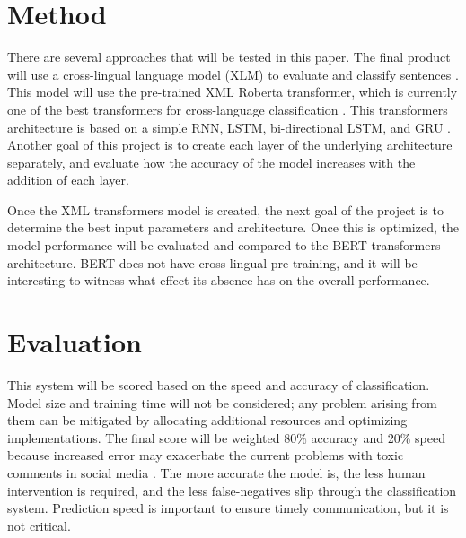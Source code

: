 \documentclass{article}
\begin{document}
\section{Method}

There are several approaches that will be tested in this paper. The final product will use a cross-lingual language model (XLM) to evaluate and classify sentences \cite{lample2019crosslingual}. This model will use the pre-trained XML Roberta transformer, which is currently one of the best transformers for cross-language classification \cite{deep_learning_approaches}. This transformers architecture is based on a simple RNN, LSTM, bi-directional LSTM, and GRU \cite{lample2019crosslingual}. Another goal of this project is to create each layer of the underlying architecture separately, and evaluate how the accuracy of the model increases with the addition of each layer.

Once the XML transformers model is created, the next goal of the project is to determine the best input parameters and architecture. Once this is optimized, the model performance will be evaluated and compared to the BERT transformers architecture. BERT does not have cross-lingual pre-training, and it will be interesting to witness what effect its absence has on the overall performance.

\section{Evaluation}

This system will be scored based on the speed and accuracy of classification. Model size and training time will not be considered; any problem arising from them can be mitigated by allocating additional resources and optimizing implementations. The final score will be weighted 80\% accuracy and 20\% speed because increased error may exacerbate the current problems with toxic comments in social media \cite{10.1145/3200947.3208069}. The more accurate the model is, the less human intervention is required, and the less false-negatives slip through the classification system. Prediction speed is important to ensure timely communication, but it is not critical.

\begin{footnotesize}


\end{footnotesize}%
\end{document}
